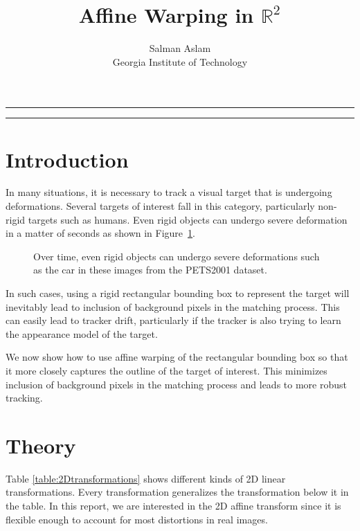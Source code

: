 
\title{Affine Warping in $\mathbb{R}^2$}
\author{Salman Aslam\\ Georgia Institute of Technology}
\date{}


\maketitle
\rule[0pt]{\textwidth}{1pt}
\tableofcontents
\rule[0pt]{\textwidth}{1pt}
\section{Introduction}
In many situations, it is necessary to track a visual target that is undergoing deformations.  Several targets of interest fall in this category, particularly non-rigid targets such as humans.  Even rigid objects can undergo severe deformation in a matter of seconds as shown in Figure~\ref{Fig:PETS2001_deformation}.  


								\begin{figure}
								\centering
								\caption{Over time, even rigid objects can undergo severe deformations such as the car in these images from the PETS2001 dataset.}
								\label{Fig:PETS2001_deformation}
								\end{figure}

In such cases, using a rigid rectangular bounding box to represent the target will inevitably lead to inclusion of background pixels in the matching process.  This can easily lead to tracker drift, particularly if the tracker is also trying to learn the appearance model of the target.

We now show how to use affine warping of the rectangular bounding box so that it more closely captures the outline of the target of interest.  This minimizes inclusion of background pixels in the matching process and leads to more robust tracking.

\section{Theory}
Table \ref{table:2Dtransformations} shows different kinds of 2D linear transformations.  Every transformation generalizes the transformation below it in the table.  In this report, we are interested in the 2D affine transform since it is flexible enough to account for most distortions in real images.

